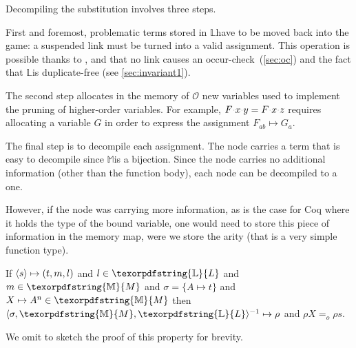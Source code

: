 \documentclass[sigconf,natbib=false,review]{acmart}
\newcommand{\appsep}{\ensuremath{\textcolor{lightgray}{\cdot}}}
\newcommand{\EqualRel}{\ensuremath{=}}
\newcommand{\Eo}{\ensuremath{\EqualRel_o}\xspace}
\newcommand{\Fo}{\texorpdfstring{\ensuremath{\mathcal{O}}\xspace}{O}}
\newcommand{\Ho}{\texorpdfstring{\ensuremath{\mathcal{M}}\xspace}{M}}
\newcommand{\mapping}[3]{\ensuremath{#1 \mapsto #2^#3}}
\newcommand{\linkStore}{\texorpdfstring{\ensuremath{\mathbb{L}}\xspace}{L}}
\newcommand{\mapStore}{\texorpdfstring{\ensuremath{\mathbb{M}}\xspace}{M}}
\begin{document}
Decompiling the substitution involves three steps.

First and foremost, problematic terms stored in
\linkStore have to be moved back into the game:
a suspended link must be turned into a valid assignment.
This operation is possible thanks to ,
and that no link causes an occur-check~(\ref{sec:oc})
and the fact that \linkStore is duplicate-free (see \cref{sec:invariant1}).

The second step allocates
in the memory of \Fo{}
new variables used to implement the pruning of higher-order variables. 
For example,
$F\appsep x\appsep y = F\appsep x\appsep z$ requires allocating a 
variable $G$ in order to express the assignment $F_{ab} \mapsto G_a$.

The final step is to decompile each assignment. The 
node carries a term that is easy to decompile since \mapStore is a bijection.
Since the  node
carries no additional information (other than the function body),
each  node can be decompiled to a  one.

However, if the  node was carrying more information,
as is the case for Coq where it holds the type of the bound variable,
one would need to store this piece of information in the memory map,
were we store the arity (that is a very simple function type).

\begin{proposition}\label{prop:comprt}
  If $\langle s \rangle\mapsto(t,m,l)$ and $l \in \linkStore$ and $m \in \mapStore$
  and
  $\sigma = \{ A \mapsto t\}$ and $\mapping{X}{A}{n} \in \mapStore$
  then $\D{\sigma}{\mapStore}{\linkStore}{\rho}$ and
  $\rho X \Eo \rho s$.
\end{proposition}

We omit to sketch the proof of this property for brevity.

\end{document}
